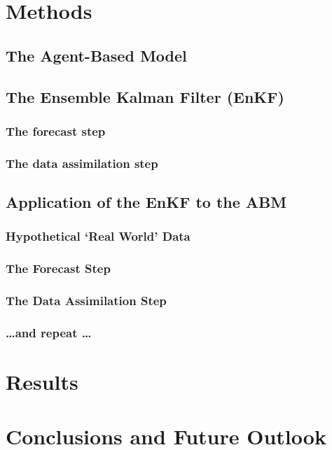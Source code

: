 \section{Methods}
\label{malleson:methods}

\subsection{The Agent-Based Model}
\label{malleson:methods:abm}

\subsection{The Ensemble Kalman Filter (EnKF)}
\label{malleson:methods:enkf}

\subsubsection{The forecast step}
\label{methods:enkf:forecast}

\subsubsection{The data assimilation step}
\label{methods:enkf:assimilation}

\subsection{Application of the EnKF to the ABM}
\label{malleson:methods:application}

\subsubsection{Hypothetical `Real World' Data}
\label{methods:application:data}

\subsubsection{The Forecast Step}
\label{methods:application:forecast}

\subsubsection{The Data Assimilation Step}
\label{methods:applicaiton:assimilation}

\subsubsection{\ldots and repeat \ldots}
\label{methods:application:repeat}

\section{Results}
\label{malleson:results}

\section{Conclusions and Future Outlook}
\label{malleson:conclusion}

